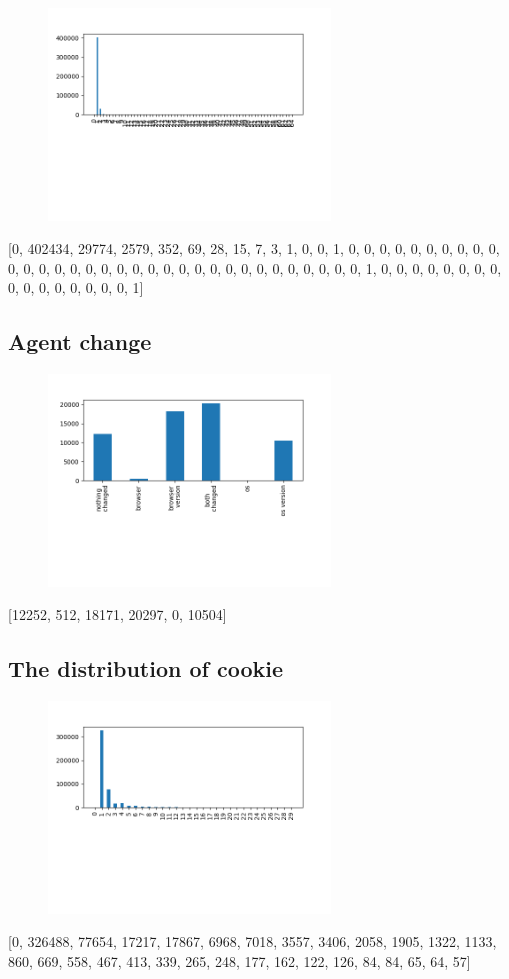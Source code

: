 \documentclass[10pt, conference, compsocconf]{IEEEtran}
\begin{document}
\begin{figure}[H]\centering\includegraphics[width=75mm,scale=0.5]{BasedonClientIDnumdevice}\end{figure}[0, 402434, 29774, 2579, 352, 69, 28, 15, 7, 3, 1, 0, 0, 1, 0, 0, 0, 0, 0, 0, 0, 0, 0, 0, 0, 0, 0, 0, 0, 0, 0, 0, 0, 0, 0, 0, 0, 0, 0, 0, 0, 0, 0, 0, 0, 0, 0, 1, 0, 0, 0, 0, 0, 0, 0, 0, 0, 0, 0, 0, 0, 0, 0, 0, 1]\subsection{Agent change}
\begin{figure}[H]\centering\includegraphics[width=75mm,scale=0.5]{BasedonClientIDagentdis}\end{figure}[12252, 512, 18171, 20297, 0, 10504]\subsection{The distribution of cookie}
\begin{figure}[H]\centering\includegraphics[width=75mm,scale=0.5]{BasedonClientIDcookiedis}\end{figure}[0, 326488, 77654, 17217, 17867, 6968, 7018, 3557, 3406, 2058, 1905, 1322, 1133, 860, 669, 558, 467, 413, 339, 265, 248, 177, 162, 122, 126, 84, 84, 65, 64, 57]
\end{document}
